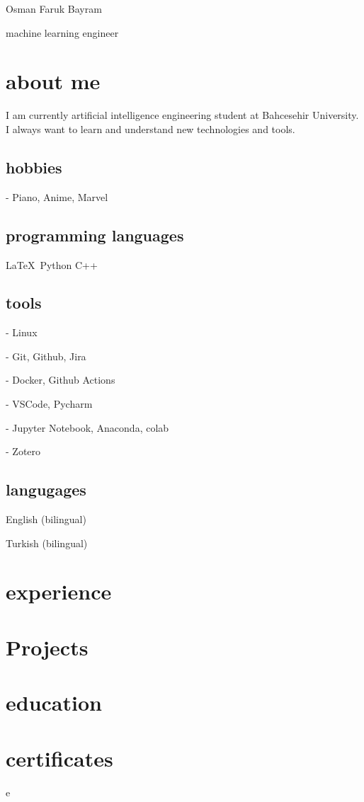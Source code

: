 \documentclass{resume-class} %
\begin{document}
\begin{center}
    Osman Faruk Bayram
\end{center}
machine learning engineer

\section{about me}

I am currently artificial intelligence engineering student at Bahcesehir University. I always want to learn and understand new technologies and tools.

\subsection{hobbies}

- Piano, Anime, Marvel


\subsection{programming languages}

\LaTeX\ Python C++

\subsection{tools}

- Linux

- Git, Github, Jira

- Docker, Github Actions

- VSCode, Pycharm

- Jupyter Notebook, Anaconda, colab

- Zotero


\subsection{langugages}

English (bilingual)

Turkish (bilingual)


\section{experience}

\section{Projects}

\section{education}

\section{certificates}

e


\footer
\end{document}
